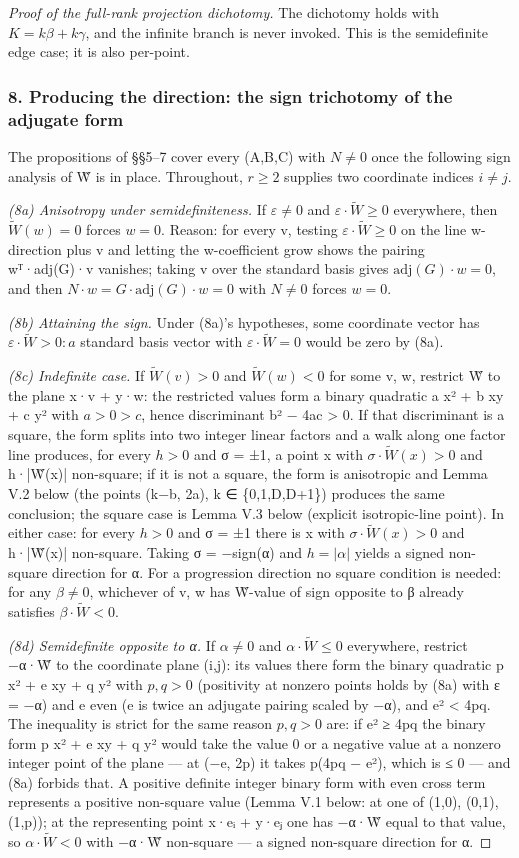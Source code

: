 \begin{proof}[Proof of the full-rank projection dichotomy]
The dichotomy holds with $K = kβ + kγ$, and the infinite branch is never invoked. This is the semidefinite edge case; it is also per-point.

\subsubsection*{8. Producing the direction: the sign trichotomy of the adjugate form}
The propositions of §§5–7 cover every (A,B,C) with $N ≠ 0$ once the following sign analysis of W̃ is in place. Throughout, $r ≥ 2$ supplies two coordinate indices $i ≠ j$.

\emph{(8a) Anisotropy under semidefiniteness.} If $ε ≠ 0$ and $ε·\tilde{W} ≥ 0$ everywhere, then $\tilde{W}(w) = 0$ forces $w = 0$. Reason: for every v, testing $ε·\tilde{W} ≥ 0$ on the line w-direction plus v and letting the w-coefficient grow shows the pairing wᵀ·adj(G)·v vanishes; taking v over the standard basis gives $\mathrm{adj}(G)·w = 0$, and then $N·w = G·\mathrm{adj}(G)·w = 0$ with $N ≠ 0$ forces $w = 0$.

\emph{(8b) Attaining the sign.} Under (8a)'s hypotheses, some coordinate vector has $ε·\tilde{W} > 0: a$ standard basis vector with $ε·\tilde{W} = 0$ would be zero by (8a).

\emph{(8c) Indefinite case.} If $\tilde{W}(v) > 0$ and $\tilde{W}(w) < 0$ for some v, w, restrict W̃ to the plane x·v + y·w: the restricted values form a binary quadratic a x² + b xy + c y² with $a > 0 > c$, hence discriminant b² − 4ac > 0. If that discriminant is a square, the form splits into two integer linear factors and a walk along one factor line produces, for every $h > 0$ and σ = ±1, a point x with $σ·\tilde{W}(x) > 0$ and h·|W̃(x)| non-square; if it is not a square, the form is anisotropic and Lemma V.2 below (the points (k−b, 2a), k ∈ \{0,1,D,D+1\}) produces the same conclusion; the square case is Lemma V.3 below (explicit isotropic-line point). In either case: for every $h > 0$ and σ = ±1 there is x with $σ·\tilde{W}(x) > 0$ and h·|W̃(x)| non-square. Taking σ = −sign(α) and $h = |α|$ yields a signed non-square direction for α. For a progression direction no square condition is needed: for any $β ≠ 0$, whichever of v, w has W̃-value of sign opposite to β already satisfies $β·\tilde{W} < 0$.

\emph{(8d) Semidefinite opposite to α.} If $α ≠ 0$ and $α·\tilde{W} ≤ 0$ everywhere, restrict −α·W̃ to the coordinate plane (i,j): its values there form the binary quadratic p x² + e xy + q y² with $p, q > 0$ (positivity at nonzero points holds by (8a) with ε = −α) and e even (e is twice an adjugate pairing scaled by −α), and e² < 4pq. The inequality is strict for the same reason $p, q > 0$ are: if e² ≥ 4pq the binary form p x² + e xy + q y² would take the value 0 or a negative value at a nonzero integer point of the plane — at (−e, 2p) it takes p(4pq − e²), which is ≤ 0 — and (8a) forbids that. A positive definite integer binary form with even cross term represents a positive non-square value (Lemma V.1 below: at one of (1,0), (0,1), (1,p)); at the representing point x·eᵢ + y·eⱼ one has −α·W̃ equal to that value, so $α·\tilde{W} < 0$ with −α·W̃ non-square — a signed non-square direction for α.


\end{proof}
